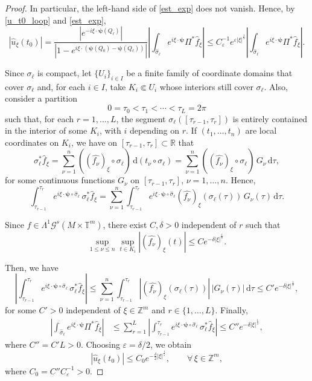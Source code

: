 \documentclass[11pt,reqno]{amsart}
\numberwithin{equation}{section}
\begin{document}
\begin{proof}
	In particular, the left-hand side of \eqref{est_exp} does not vanish.
	Hence, by \eqref{u_t0_loop} and \eqref{est_exp},
	\begin{equation*}
		|\widehat{u}_\xi(t_0)|
		=
		\dfrac{|e^{-i\xi\cdot\boldsymbol{\psi}(Q_\ell)}|}{|1-e^{i\xi\cdot(\boldsymbol{\psi}(Q_0)-\boldsymbol{\psi}(Q_\ell))}|}
		\left|\int_{\hat\sigma_\ell}e^{i\xi\cdot\boldsymbol{\psi}}\Pi^*\widehat{f}_\xi\right|
		\leq
		C_\varepsilon^{-1}e^{\varepsilon|\xi|^{\frac{1}{s}}}
		\left|\int_{\hat\sigma_\ell}e^{i\xi\cdot\boldsymbol{\psi}}\Pi^*\widehat{f}_\xi\right|.
	\end{equation*}
	
	Since \(\sigma_\ell\) is compact, let \(\{U_i\}_{i\in I}\) be a finite family of coordinate domains that cover \(\sigma_\ell\) and,
	for each \(i\in I\), take \(K_i\Subset U_i\) whose interiors still cover \(\sigma_\ell\).
	Also, consider a partition
	\[
	0=\tau_0<\tau_1<\cdots<\tau_L=2\pi
	\]
	such that, for each \(r=1,\dots,L\), the segment \(\sigma_\ell([\tau_{r-1},\tau_r])\) is entirely contained in the interior of some \(K_i\),
	with \(i\) depending on \(r\).
	If \((t_1,\dots,t_n)\) are local coordinates on \(K_i\), we have on \([\tau_{r-1},\tau_r]\subset\mathbb{R}\) that
	\[
	\sigma_\ell^*\widehat{f}_\xi
	= \sum_{\nu=1}^{n}((\widehat{f_\nu})_\xi\circ\sigma_\ell)\,\mathrm{d}(t_\nu\circ\sigma_\ell)
	= \sum_{\nu=1}^{n}((\widehat{f_\nu})_\xi\circ\sigma_\ell)\,G_\nu\,\mathrm{d}\tau,
	\]
	for some continuous functions \(G_\nu\) on \([\tau_{r-1},\tau_r]\), $\nu=1,\dots,n$. Hence,
	\[
	\int_{\tau_{r-1}}^{\tau_r} e^{i\xi\cdot\boldsymbol{\psi}\circ\hat\sigma_\ell}
	\,\sigma_\ell^*\widehat{f}_\xi 
	= \sum_{\nu=1}^{n}\int_{\tau_{r-1}}^{\tau_r} e^{i\xi\cdot \boldsymbol{\psi} \circ\hat\sigma_\ell} 	(\widehat{f_\nu})_\xi (\sigma_\ell(\tau)) \,G_\nu(\tau) \,\mathrm{d}\tau.
	\]
	
	
	Since \(f\in\mathsf{\Lambda}^1\mathscr{G}^s(M\times\mathbb{T}^m)\), there exist \(C,\delta>0\) independent of \(r\) such that
	\[
	\sup_{1\leq \nu\leq n}\sup_{t\in K_i}|(\widehat{f_\nu})_\xi(t)| \leq Ce^{-\delta|\xi|^{\frac{1}{s}}}.
	\]
	
	Then, we have
	\[
	\left|\int_{\tau_{r-1}}^{\tau_r}
	e^{i\xi\cdot\boldsymbol{\psi}\circ\hat\sigma_\ell}\,\sigma_\ell^*\widehat{f}_\xi\right| \leq \sum_{\nu=1}^n\int_{\tau_{r-1}}^{\tau_r} |(\widehat{f_\nu})_\xi (\sigma_\ell(\tau))|\,|G_\nu(\tau)|\,\mathrm{d}\tau
	\leq
	C'e^{-\delta|\xi|^{\frac{1}{s}}},
	\]
	for some \(C'>0\) independent of \(\xi\in\mathbb{Z}^m\) and \(r\in\{1,\dots,L\}\).
	Finally,
	\begin{align*}
		\left|\int_{\hat{\sigma}_\ell}e^{i\xi\cdot \boldsymbol{\psi}}\Pi^*\widehat{f}_\xi\right|
		& \leq 	\sum_{r=1}^L \left|\int_{\tau_{r-1}}^{\tau_r} e^{i\xi\cdot \boldsymbol{\psi}\circ\hat\sigma_\ell}\,\sigma_\ell^*\widehat{f}_\xi\right|
		\leq C''e^{-\delta|\xi|^{\frac{1}{s}}},
	\end{align*}
	where \(C''=C'L>0\).
	Choosing \(\varepsilon=\delta/2\), we obtain
	\begin{equation*}
		|\widehat{u}_\xi(t_0)| 	\leq C_0e^{-\frac{\delta}{2}|\xi|^{\frac{1}{s}}},
		\qquad\forall\,\xi\in\mathbb{Z}^m,
	\end{equation*}
	where \(C_0=C''C_\varepsilon^{-1}>0\).
	

\end{proof}
\end{document}
